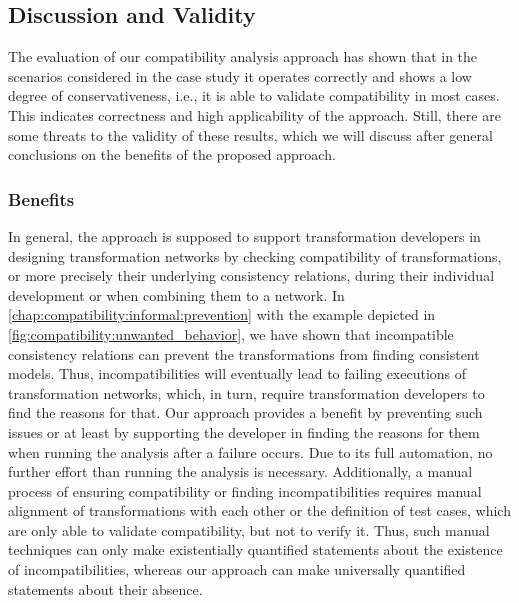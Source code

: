 \subsection{Discussion and Validity}

The evaluation of our compatibility analysis approach has shown that in the scenarios considered in the case study it operates correctly and shows a low degree of conservativeness, i.e., it is able to validate compatibility in most cases.
This indicates correctness and high applicability of the approach.
Still, there are some threats to the validity of these results, which we will discuss after general conclusions on the benefits of the proposed approach.

\subsubsection{Benefits}

In general, the approach is supposed to support transformation developers in designing transformation networks by checking compatibility of transformations, or more precisely their underlying consistency relations, during their individual development or when combining them to a network.
In \autoref{chap:compatibility:informal:prevention} with the example depicted in \autoref{fig:compatibility:unwanted_behavior}, we have shown that incompatible consistency relations can prevent the transformations from finding consistent models.
Thus, incompatibilities will eventually lead to failing executions of transformation networks, which, in turn, require transformation developers to find the reasons for that.
Our approach provides a benefit by preventing such issues or at least by supporting the developer in finding the reasons for them when running the analysis after a failure occurs.
Due to its full automation, no further effort than running the analysis is necessary.
Additionally, a manual process of ensuring compatibility or finding incompatibilities requires manual alignment of transformations with each other or the definition of test cases, which are only able to validate compatibility, but not to verify it.
Thus, such manual techniques can only make existentially quantified statements about the existence of incompatibilities, whereas our approach can make universally quantified statements about their absence.

